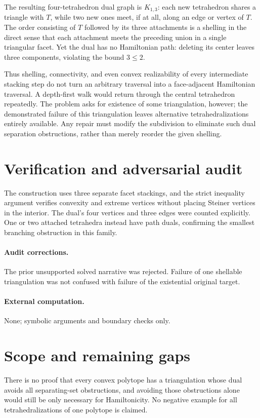 \documentclass[11pt,a4paper]{article}
\begin{document}
The resulting four-tetrahedron dual graph is $K_{1,3}$: each new tetrahedron
shares a triangle with $T$, while two new ones meet, if at all, along an edge
or vertex of $T$. The order consisting of $T$ followed by its three attachments
is a shelling in the direct sense that each attachment meets the preceding
union in a single triangular facet. Yet the dual has no Hamiltonian path:
deleting its center leaves three components, violating the bound $3\le2$.

Thus shelling, connectivity, and even convex realizability of every intermediate
stacking step do not turn an arbitrary traversal into a face-adjacent
Hamiltonian traversal. A depth-first walk would return through the central
tetrahedron repeatedly. The problem asks for existence of some triangulation,
however; the demonstrated failure of this triangulation leaves alternative
tetrahedralizations entirely available. Any repair must modify the subdivision
to eliminate such dual separation obstructions, rather than merely reorder the
given shelling.
\section{Verification and adversarial audit}
The construction uses three separate facet stackings, and the strict
inequality argument verifies convexity and extreme vertices without placing
Steiner vertices in the interior. The dual's four vertices and three edges were
counted explicitly. One or two attached tetrahedra instead have path duals,
confirming the smallest branching obstruction in this family.
\paragraph{Audit corrections.} The prior unsupported solved narrative was rejected. Failure of one shellable triangulation was not confused with failure of the existential original target.
\paragraph{External computation.} None; symbolic arguments and boundary checks only.
\section{Scope and remaining gaps}
There is no proof that every convex polytope has a triangulation whose dual
avoids all separating-set obstructions, and avoiding those obstructions alone
would still be only necessary for Hamiltonicity. No negative example for all
tetrahedralizations of one polytope is claimed.
\end{document}
